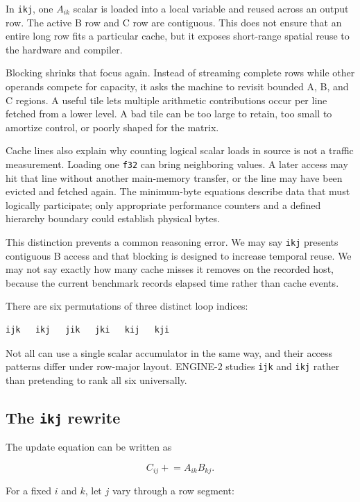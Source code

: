 \documentclass[
  10pt,
]{article}
\begin{document}
In \texttt{ikj}, one \(A_{ik}\) scalar is loaded into a local variable
and reused across an output row. The active B row and C row are
contiguous. This does not ensure that an entire long row fits a
particular cache, but it exposes short-range spatial reuse to the
hardware and compiler.

Blocking shrinks that focus again. Instead of streaming complete rows
while other operands compete for capacity, it asks the machine to
revisit bounded A, B, and C regions. A useful tile lets multiple
arithmetic contributions occur per line fetched from a lower level. A
bad tile can be too large to retain, too small to amortize control, or
poorly shaped for the matrix.

Cache lines also explain why counting logical scalar loads in source is
not a traffic measurement. Loading one \texttt{f32} can bring
neighboring values. A later access may hit that line without another
main-memory transfer, or the line may have been evicted and fetched
again. The minimum-byte equations describe data that must logically
participate; only appropriate performance counters and a defined
hierarchy boundary could establish physical bytes.

This distinction prevents a common reasoning error. We may say
\texttt{ikj} presents contiguous B access and that blocking is designed
to increase temporal reuse. We may not say exactly how many cache misses
it removes on the recorded host, because the current benchmark records
elapsed time rather than cache events.

There are six permutations of three distinct loop indices:

\begin{verbatim}
ijk   ikj   jik   jki   kij   kji
\end{verbatim}

Not all can use a single scalar accumulator in the same way, and their
access patterns differ under row-major layout. ENGINE-2 studies
\texttt{ijk} and \texttt{ikj} rather than pretending to rank all six
universally.

\subsection{\texorpdfstring{The \texttt{ikj}
rewrite}{The ikj rewrite}}\label{the-ikj-rewrite}

The update equation can be written as

\[
C_{ij}\mathrel{+}=A_{ik}B_{kj}.
\]

For a fixed \(i\) and \(k\), let \(j\) vary through a row segment:
\end{document}
